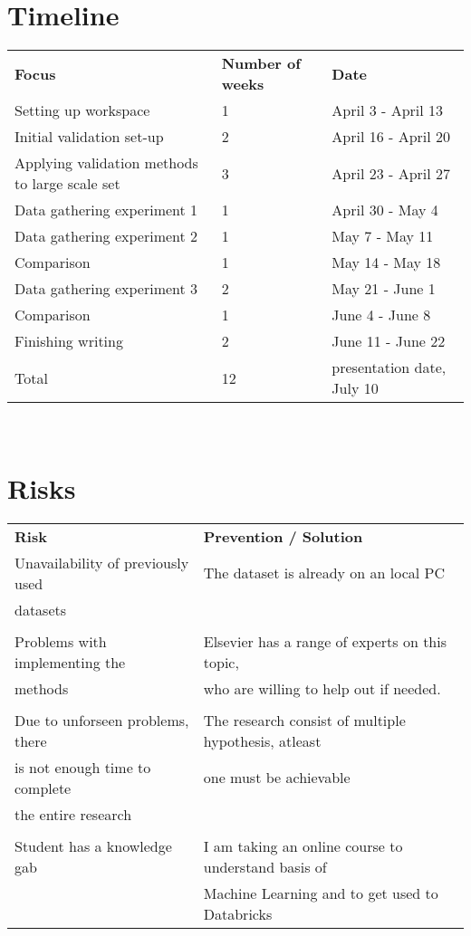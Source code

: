 \documentclass[10pt,a4paper]{article}
\begin{document}
\section{Timeline}
\begin{center}
\begin{tabular}{lll}
\textbf{Focus} & \textbf{Number of weeks} & \textbf{Date} \\
Setting up workspace & 1 & April 3 - April 13\\
Initial validation set-up & 2 & April 16 - April 20\\
Applying validation methods to large scale set & 3 & April 23 - April 27\\
Data gathering experiment 1 & 1 & April 30 - May 4\\
Data gathering experiment 2 & 1 & May 7 - May 11\\
Comparison & 1 & May 14 - May 18\\
Data gathering experiment 3 & 2 & May 21 - June 1 \\
Comparison & 1 & June 4 - June 8\\
Finishing writing & 2 & June 11 - June 22\\
Total & 12 & presentation date, July 10\\
\end{tabular}\\
\end{center}
\section{Risks}
\begin{tabular}{ll}
\textbf{Risk} & \textbf{Prevention / Solution}\\
Unavailability of previously used & The dataset is already on an local PC\\datasets&\\&\\
Problems with implementing the& Elsevier has a range of experts on this topic,
\\methods&who are willing to help out if needed.\\&\\
Due to unforseen problems, there &The research consist of multiple hypothesis, atleast \\is not enough time to complete & one must be achievable\\the entire research &\\&\\
Student has a knowledge gab & I am taking an online course to understand basis of \\
 &Machine Learning and to get used to Databricks\\
\end{tabular}\\
\newpage
\end{document}
